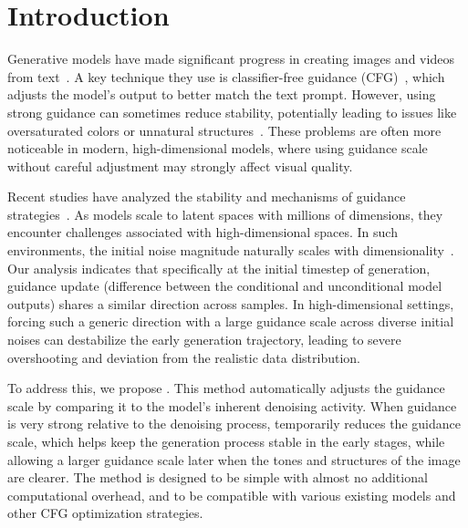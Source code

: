 

\section{Introduction}

Generative models have made significant progress in creating images and videos from text~\citep{song2020denoising,dhariwal2021diffusion,peebles2023scalable,ho2022video,esser2023structure}. A key technique they use is classifier-free guidance (CFG)~\citep{ho2022classifier}, which adjusts the model's output to better match the text prompt. However, using strong guidance can sometimes reduce stability, potentially leading to issues like oversaturated colors or unnatural structures~\citep{karczewski2024diffusion,sadat2024eliminating}. These problems are often more noticeable in modern, high-dimensional models, where using guidance scale without careful adjustment may strongly affect visual quality.

Recent studies have analyzed the stability and mechanisms of guidance strategies~\cite{lin2024common, wang2025foresight}. As models scale to latent spaces with millions of dimensions, they encounter challenges associated with high-dimensional spaces. In such environments, the initial noise magnitude naturally scales with dimensionality~\cite{debortoli2022riemannian}. Our analysis indicates that specifically at the initial timestep of generation, guidance update (difference between the conditional and unconditional model outputs) shares a similar direction across samples. In high-dimensional settings, forcing such a generic direction with a large guidance scale across diverse initial noises can destabilize the early generation trajectory, leading to severe overshooting and deviation from the realistic data distribution.

To address this, we propose \mtd. This method automatically adjusts the guidance scale by comparing it to the model's inherent denoising activity. When guidance is very strong relative to the denoising process, \mtdbk temporarily reduces the guidance scale, which helps keep the generation process stable in the early stages, while allowing a larger guidance scale later when the tones and structures of the image are clearer. The method is designed to be simple with almost no additional computational overhead, and to be compatible with various existing models and other CFG optimization strategies.

